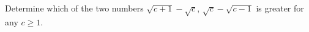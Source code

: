 Determine which of the two numbers $\sqrt{c+1}-\sqrt{c}$,  $\sqrt{c}-\sqrt{c-1}$ is greater for any $c\ge 1$.